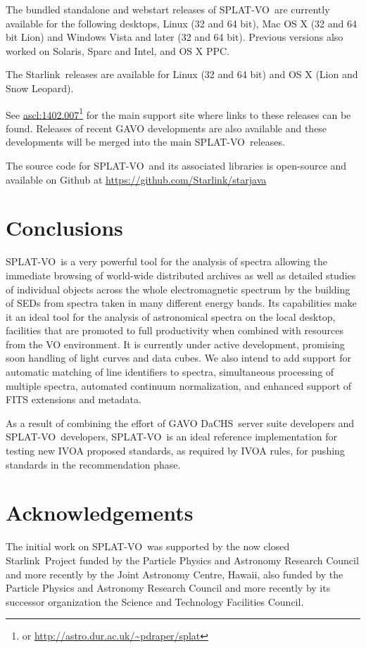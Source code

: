 \documentclass[final,authoryear,5p,times,twocolumn]{elsarticle}
\newcommand{\splatvo}{{\textsf{\small{SPLAT-VO}}}}
\newcommand{\dachs}{\textsf{\small DaCHS}}
\newcommand{\Starlink}{\textsf{\small Starlink}}
\newcommand{\ascl}[1]{\href{http://www.ascl.net/#1}{ascl:#1}}
\begin{document}
The bundled standalone and webstart releases of \splatvo\ are currently
available for the following desktops, Linux (32 and 64 bit), Mac OS X (32 and
64 bit Lion) and Windows Vista and later (32 and 64 bit). Previous versions
also worked on Solaris, Sparc and Intel, and OS X PPC.

The \Starlink\ releases \citep[e.g.,][]{currie_adassxxiii,2013ASPC..475..247B}
are available for Linux (32 and 64 bit) and OS X (Lion and Snow Leopard).

See \ascl{1402.007}\footnote{or \url{http://astro.dur.ac.uk/~pdraper/splat}}
for the main support site where links to these releases can be found.  Releases
of recent GAVO developments are also available and these developments will be
merged into the main \splatvo\ releases.

The source code for \splatvo\ and its associated libraries is open-source and
available on Github at \url{https://github.com/Starlink/starjava}

\section{Conclusions}
%
\splatvo\ is a very powerful tool for the analysis of spectra allowing the
immediate browsing of world-wide distributed archives as well as detailed
studies of individual objects across the whole electromagnetic spectrum by the
building of SEDs from spectra taken in many different energy bands. Its
capabilities make it an ideal tool for the analysis of astronomical spectra on
the local desktop, facilities that are promoted to full productivity when
combined with resources from the VO environment. It is currently under active
development, promising soon handling of light curves and data cubes. We also
intend to add support for automatic matching of line identifiers to spectra,
simultaneous processing of multiple spectra, automated continuum normalization,
and enhanced support of FITS extensions and metadata.

As a result of combining the effort of GAVO \dachs\ server suite developers and
\splatvo\ developers, \splatvo\ is an ideal reference implementation for
testing new IVOA proposed standards, as required by IVOA rules, for pushing
standards in the recommendation phase.

\section*{Acknowledgements}
%
The initial work on \splatvo\ was supported by the now closed \Starlink\
Project funded by the Particle Physics and Astronomy Research Council and more
recently by the Joint Astronomy Centre, Hawaii, also funded by the Particle
Physics and Astronomy Research Council and more recently by its successor
organization the Science and Technology Facilities Council.
\end{document}
